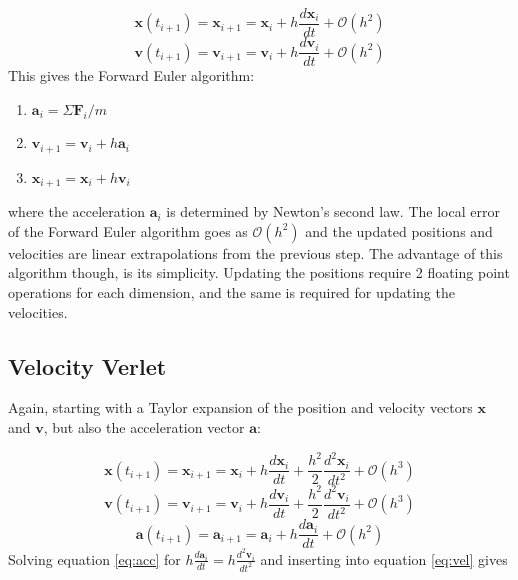 \documentclass{article}
\begin{document}
\begin{equation}
\bm{x}(t_{i+1}) = \bm{x}_{i+1} = \bm{x}_i + h\frac{d\bm{x}_i}{dt} + \mathcal{O}(h^2)
\end{equation}
\begin{equation} 
\bm{v}(t_{i+1}) = \bm{v}_{i+1} = \bm{v}_i + h\frac{d\bm{v}_i}{dt} + \mathcal{O}(h^2)
\end{equation} 
This gives the Forward Euler algorithm:
\begin{enumerate}
\item $\bm{a}_i = \Sigma\bm{F}_i/m$
\item $\bm{v}_{i+1} = \bm{v}_i + h\bm{a}_i$
\item $\bm{x}_{i+1} = \bm{x}_i + h\bm{v}_i$
\end{enumerate}
where the acceleration $\bm{a}_i$ is determined by Newton's second law. The local error of the Forward Euler algorithm goes as $\mathcal{O}(h^2)$ and the updated positions and velocities are linear extrapolations from the previous step. The advantage of this algorithm though, is its simplicity. Updating the positions require 2 floating point operations for each dimension, and the same is required for updating the velocities.

\subsection{Velocity Verlet}
\label{sec:verlet}
Again, starting with a Taylor expansion of the position and velocity vectors $\bm{x}$ and $\bm{v}$, but also the acceleration vector $\bm{a}$:

\begin{equation}
\bm{x}(t_{i+1}) = \bm{x}_{i+1} = \bm{x}_i + h\frac{d\bm{x}_i}{dt} + \frac{h^2}{2}\frac{d^2\bm{x}_i}{dt^2} + \mathcal{O}(h^3)
\end{equation}
\begin{equation} 
\bm{v}(t_{i+1}) = \bm{v}_{i+1} = \bm{v}_i + h\frac{d\bm{v}_i}{dt} + \frac{h^2}{2}\frac{d^2\bm{v}_i}{dt^2} + \mathcal{O}(h^3)
\label{eq:vel}
\end{equation} 
\begin{equation} 
\bm{a}(t_{i+1}) = \bm{a}_{i+1} = \bm{a}_i + h\frac{d\bm{a}_i}{dt} + \mathcal{O}(h^2)
\label{eq:acc}
\end{equation}
Solving equation \ref{eq:acc} for $h\frac{d\bm{a}_i}{dt} = h\frac{d^2\bm{v}_i}{dt^2}$ and inserting into equation \ref{eq:vel} gives 
\end{document}
